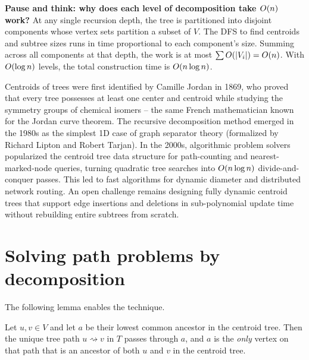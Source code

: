 \begin{recoverybox}
\textbf{Pause and think: why does each level of decomposition take $O(n)$ work?}
At any single recursion depth, the tree is partitioned into disjoint components whose vertex sets partition a subset of $V$. The DFS to find centroids and subtree sizes runs in time proportional to each component's size. Summing across all components at that depth, the work is at most $\sum O(\lvert V_i\rvert) = O(n)$. With $O(\log n)$ levels, the total construction time is $O(n\log n)$.
\end{recoverybox}

\begin{historybox}
Centroids of trees were first identified by Camille Jordan in 1869, who proved that every tree possesses at least one center and centroid while studying the symmetry groups of chemical isomers -- the same French mathematician known for the Jordan curve theorem. The recursive decomposition method emerged in the 1980s as the simplest 1D case of graph separator theory (formalized by Richard Lipton and Robert Tarjan). In the 2000s, algorithmic problem solvers popularized the centroid tree data structure for path-counting and nearest-marked-node queries, turning quadratic tree searches into $O(n\log n)$ divide-and-conquer passes. This led to fast algorithms for dynamic diameter and distributed network routing. An open challenge remains designing fully dynamic centroid trees that support edge insertions and deletions in sub-polynomial update time without rebuilding entire subtrees from scratch.
\end{historybox}

\section{Solving path problems by decomposition}
\label{ch20:pathkey}

The following lemma enables the technique.

\begin{lemma}
\label{ch20:lem-pathkey}
Let $u,v\in V$ and let $a$ be their lowest common ancestor in the centroid tree.
Then the unique tree path $u\!\rightsquigarrow\! v$ in $T$ passes through $a$, and
$a$ is the \emph{only} vertex on that path that is an ancestor of both $u$ and $v$
in the centroid tree.
\end{lemma}


